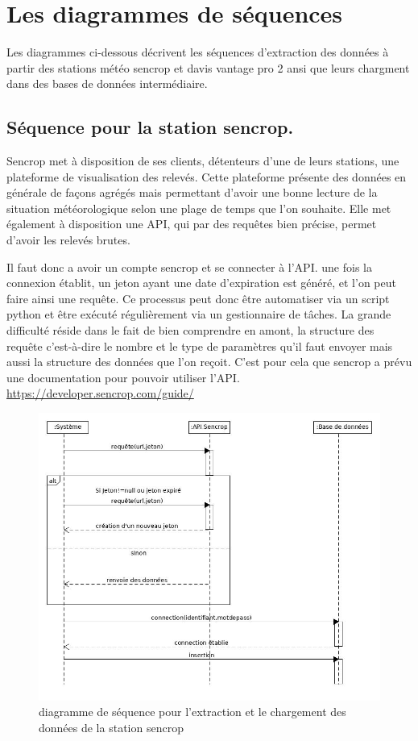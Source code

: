 \section{Les diagrammes de séquences}
 
Les diagrammes ci-dessous décrivent les séquences d’extraction des données à partir des stations météo sencrop et davis vantage pro 2 ansi que leurs chargment dans des bases de données intermédiaire. 
\subsection{Séquence pour la station sencrop.}
Sencrop met à disposition de ses clients, détenteurs d’une de leurs stations, une plateforme de visualisation des relevés. Cette plateforme présente des données en générale de façons agrégés mais permettant d’avoir une bonne lecture de la situation météorologique selon une plage de temps que l’on souhaite. Elle met également à disposition une API, qui par des requêtes bien précise, permet d’avoir les relevés brutes.  

Il faut donc a avoir un compte sencrop et se connecter à l’API. une fois la connexion établit, un jeton ayant une date d’expiration est généré, et l’on peut faire ainsi une requête. Ce processus peut donc être automatiser via un script python et être exécuté régulièrement via un gestionnaire de tâches. La grande difficulté réside dans le fait de bien comprendre en amont, la structure des requête c’est-à-dire le nombre et le type de paramètres qu’il faut envoyer mais aussi la structure des données que l’on reçoit. C’est pour cela que sencrop a prévu une documentation pour pouvoir utiliser l’API. 
\newline
\url{https://developer.sencrop.com/guide/}  
\begin{figure}[!h]
    \centering
     \includegraphics[width=.7\textwidth]{images/sencrop_senquence_diagrame.jpg}
    \caption{diagramme de séquence pour l'extraction et le chargement des données de la station sencrop}
  
\end{figure}

